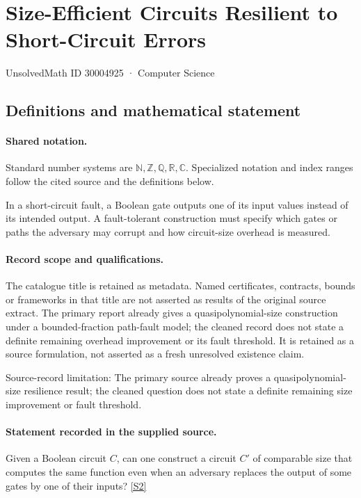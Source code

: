 \documentclass[11pt]{article}
\newcommand{\sref}[2]{\hyperlink{source:#1:#2}{[S#2]}}
\begin{document}
\setcounter{section}{30004924}
\section{Size-Efficient Circuits Resilient to Short-Circuit Errors}\label{30004925}
{\small\sffamily UnsolvedMath ID 30004925 · Computer Science}
\subsection{Definitions and mathematical statement}

\paragraph{Shared notation.}Standard number systems are $\mathbb N,\mathbb Z,\mathbb Q,\mathbb R,\mathbb C$. Specialized notation and index ranges follow the cited source and the definitions below.


In a short-circuit fault, a Boolean gate outputs one of its input values instead of its intended output. A fault-tolerant construction must specify which gates or paths the adversary may corrupt and how circuit-size overhead is measured.
\paragraph{Record scope and qualifications.}
The catalogue title is retained as metadata. Named certificates, contracts, bounds or frameworks in that title are not asserted as results of the original source extract.
The primary report already gives a quasipolynomial-size construction under a bounded-fraction path-fault model; the cleaned record does not state a definite remaining overhead improvement or its fault threshold. It is retained as a source formulation, not asserted as a fresh unresolved existence claim.

Source-record limitation: The primary source already proves a quasipolynomial-size resilience result; the cleaned question does not state a definite remaining size improvement or fault threshold.
\paragraph{Statement recorded in the supplied source.}
Given a Boolean circuit $C$, can one construct a circuit $C'$ of comparable size that computes the same function even when an adversary replaces the output of some gates by one of their inputs? \sref{30004925}{2}
\end{document}

